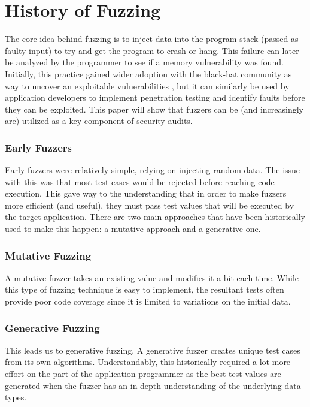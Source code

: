 \chapter{History of Fuzzing}
\label{sec:2}

The core idea behind fuzzing is to inject data into the program stack (passed as faulty input) to try and get the program to crash or hang\cite{fuzz-by-number}. This failure can later be analyzed by the programmer to see if a memory vulnerability was found. Initially, this practice gained wider adoption with the black-hat community as way to uncover an exploitable vulnerabilities \cite{fuzzing-ppf}, but it can similarly be used by application developers to implement penetration testing and identify faults before they can be exploited. This paper will show that fuzzers can be (and increasingly are) utilized as a key component of security audits.

\subsection{Early Fuzzers}

Early fuzzers were relatively simple, relying on injecting random data. The issue with this was that most test cases would be rejected before reaching code execution\cite{mil-fuzz}. This gave way to the understanding that in order to make fuzzers more efficient (and useful), they must pass test values that will be executed by the target application. There are two main approaches that have been historically used to make this happen: a mutative approach and a generative one\cite{mil-fuzz}.

\subsection{Mutative Fuzzing}

A mutative fuzzer takes an existing value and modifies it a bit each time. While this type of fuzzing technique is easy to implement, the resultant tests often provide poor code coverage \cite{fuzzing-ppf} since it is limited to variations on the initial data.

\subsection{Generative Fuzzing}

This leads us to generative fuzzing. A generative fuzzer creates unique test cases from its own algorithms. Understandably, this historically required a lot more effort on the part of the application programmer as the best test values are generated when the fuzzer has an in depth understanding of the underlying data types\cite{fuzzing-ppf}.

